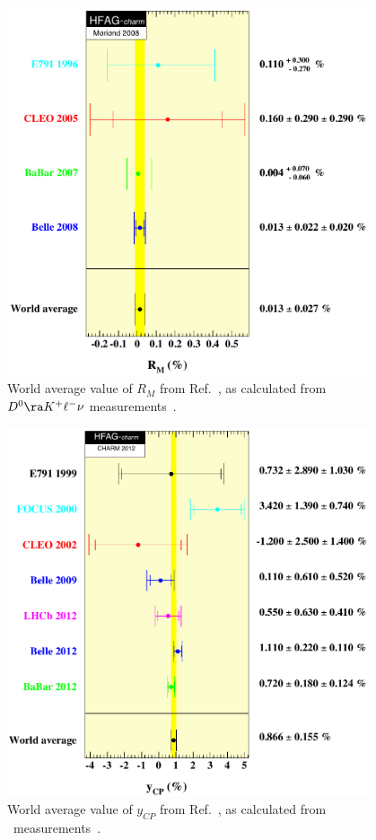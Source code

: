 \begin{figure}
\begin{center}
\includegraphics[width=4.2in]{figures/charm/rm_semi_9mar08}
\end{center}
\vskip-0.20in
\caption{\label{fig:rm_semi}
World average value of $R^{}_M$ from Ref.~\cite{HFAG_charm:webpage},
as calculated from $D^0\ra K^+\ell^-\nu$ 
measurements~\cite{Aitala:1996vz,Cawlfield:2005ze,Aubert:2007aa,Bitenc:2008bk}. }
\end{figure}

\begin{figure}
\begin{center}
\includegraphics[width=4.2in]{figures/charm/ycp_13may12}
\end{center}
\vskip-0.20in
\caption{\label{fig:ycp}
World average value of $y^{}_{CP}$ from 
Ref.~\cite{HFAG_charm:webpage}, as calculated from \dkkpp\ 
measurements~\cite{Aitala:1999dt,Link:2000cu,Csorna:2001ww,
Zupanc:2009sy,Staric:2012ta,Lees:2012qh,Aaij:2011ad}.  }
\end{figure}



